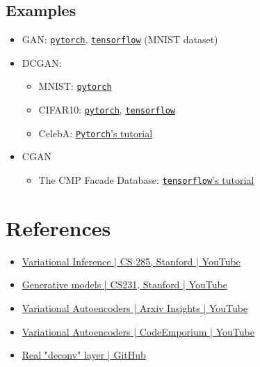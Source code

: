 \subsection{Examples}
\begin{itemize}
	\item \ac{GAN}: \href{https://github.com/diegoalejogm/gans/blob/master/1.%20Vanilla%20GAN%20PyTorch.ipynb}{\texttt{pytorch}}, \href{https://github.com/diegoalejogm/gans/blob/master/1.%20Vanilla%20GAN%20TensorFlow.ipynb}{\texttt{tensorflow}} (MNIST dataset)
	\item \ac{DCGAN}:
	\begin{itemize}
		\item MNIST: \href{https://github.com/diegoalejogm/gans/blob/master/2.%20DC-GAN%20PyTorch-MNIST.ipynb}{\texttt{pytorch}}
		\item CIFAR10: \href{https://github.com/diegoalejogm/gans/blob/master/2.%20DC-GAN%20PyTorch.ipynb}{\texttt{pytorch}}, \href{https://github.com/diegoalejogm/gans/blob/master/2.%20DC-GAN%20TensorFlow.ipynb}{\texttt{tensorflow}}
		\item CelebA: \href{https://pytorch.org/tutorials/beginner/dcgan\_faces\_tutorial.html}{\texttt{Pytorch}'s tutorial}
	\end{itemize}
	\item \ac{CGAN}
	\begin{itemize}
		\item The CMP Facade Database: \href{https://www.tensorflow.org/tutorials/generative/pix2pix}{\texttt{tensorflow}'s tutorial}
	\end{itemize}
\end{itemize}

\section{References}
\begin{itemize}
	\item \href{https://youtu.be/UTMpM4orS30}{Variational Inference | CS 285, Stanford | YouTube}
	\item \href{https://youtu.be/5WoItGTWV54}{Generative models | CS231, Stanford | YouTube}
	\item \href{https://youtu.be/9zKuYvjFFS8}{Variational Autoencoders | Arxiv Insights | YouTube}
	\item \href{https://youtu.be/fcvYpzHmhvA}{Variational Autoencoders | CodeEmporium | YouTube}
	\item \href{https://github.com/vdumoulin/conv_arithmetic}{Real "deconv" layer | GitHub}
\end{itemize}